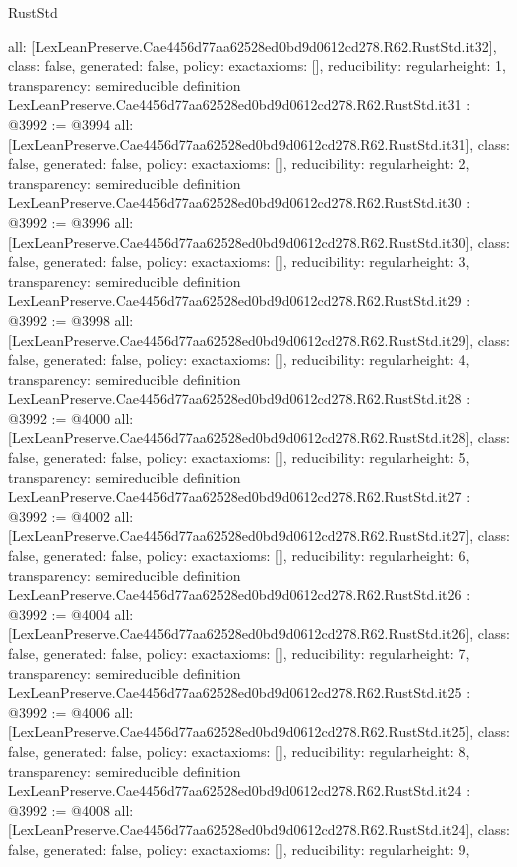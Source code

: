 \begin{lexlean}{RustStd}
\begin{coremodule}
{  all: [LexLeanPreserve.Cae4456d77aa62528ed0bd9d0612cd278.R62.RustStd.it32],
  class: false,
  generated: false,
  policy: exact{axioms: []},
  reducibility: regular{height: 1},
  transparency: semireducible
}
definition LexLeanPreserve.Cae4456d77aa62528ed0bd9d0612cd278.R62.RustStd.it31 : @3992 := @3994 {
  all: [LexLeanPreserve.Cae4456d77aa62528ed0bd9d0612cd278.R62.RustStd.it31],
  class: false,
  generated: false,
  policy: exact{axioms: []},
  reducibility: regular{height: 2},
  transparency: semireducible
}
definition LexLeanPreserve.Cae4456d77aa62528ed0bd9d0612cd278.R62.RustStd.it30 : @3992 := @3996 {
  all: [LexLeanPreserve.Cae4456d77aa62528ed0bd9d0612cd278.R62.RustStd.it30],
  class: false,
  generated: false,
  policy: exact{axioms: []},
  reducibility: regular{height: 3},
  transparency: semireducible
}
definition LexLeanPreserve.Cae4456d77aa62528ed0bd9d0612cd278.R62.RustStd.it29 : @3992 := @3998 {
  all: [LexLeanPreserve.Cae4456d77aa62528ed0bd9d0612cd278.R62.RustStd.it29],
  class: false,
  generated: false,
  policy: exact{axioms: []},
  reducibility: regular{height: 4},
  transparency: semireducible
}
definition LexLeanPreserve.Cae4456d77aa62528ed0bd9d0612cd278.R62.RustStd.it28 : @3992 := @4000 {
  all: [LexLeanPreserve.Cae4456d77aa62528ed0bd9d0612cd278.R62.RustStd.it28],
  class: false,
  generated: false,
  policy: exact{axioms: []},
  reducibility: regular{height: 5},
  transparency: semireducible
}
definition LexLeanPreserve.Cae4456d77aa62528ed0bd9d0612cd278.R62.RustStd.it27 : @3992 := @4002 {
  all: [LexLeanPreserve.Cae4456d77aa62528ed0bd9d0612cd278.R62.RustStd.it27],
  class: false,
  generated: false,
  policy: exact{axioms: []},
  reducibility: regular{height: 6},
  transparency: semireducible
}
definition LexLeanPreserve.Cae4456d77aa62528ed0bd9d0612cd278.R62.RustStd.it26 : @3992 := @4004 {
  all: [LexLeanPreserve.Cae4456d77aa62528ed0bd9d0612cd278.R62.RustStd.it26],
  class: false,
  generated: false,
  policy: exact{axioms: []},
  reducibility: regular{height: 7},
  transparency: semireducible
}
definition LexLeanPreserve.Cae4456d77aa62528ed0bd9d0612cd278.R62.RustStd.it25 : @3992 := @4006 {
  all: [LexLeanPreserve.Cae4456d77aa62528ed0bd9d0612cd278.R62.RustStd.it25],
  class: false,
  generated: false,
  policy: exact{axioms: []},
  reducibility: regular{height: 8},
  transparency: semireducible
}
definition LexLeanPreserve.Cae4456d77aa62528ed0bd9d0612cd278.R62.RustStd.it24 : @3992 := @4008 {
  all: [LexLeanPreserve.Cae4456d77aa62528ed0bd9d0612cd278.R62.RustStd.it24],
  class: false,
  generated: false,
  policy: exact{axioms: []},
  reducibility: regular{height: 9},
}
\end{coremodule}
\end{lexlean}
